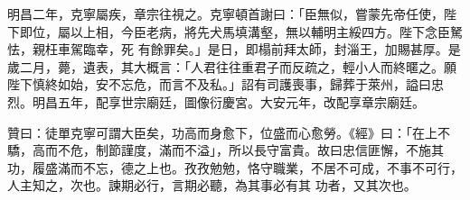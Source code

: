 \begin{pinyinscope}
 明昌二年，克寧屬疾，章宗往視之。克寧頓首謝曰：「臣無似，嘗蒙先帝任使，陛下即位，屬以上相，今臣老病，將先犬馬填溝壑，無以輔明主綏四方。陛下念臣駑怯，親枉車駕臨幸，死
 有餘罪矣。」是日，即榻前拜太師，封淄王，加賜甚厚。是歲二月，薨，遺表，其大概言：「人君往往重君子而反疏之，輕小人而終暱之。願陛下慎終如始，安不忘危，而言不及私。」詔有司護喪事，歸葬于萊州，謚曰忠烈。明昌五年，配享世宗廟廷，圖像衍慶宮。大安元年，改配享章宗廟廷。



 贊曰：徒單克寧可謂大臣矣，功高而身愈下，位盛而心愈勞。《經》曰：「在上不驕，高而不危，制節謹度，滿而不溢」，所以長守富貴。故曰忠信匪懈，不施其功，履盛滿而不忘，德之上也。孜孜勉勉，恪守職業，不居不可成，不事不可行，人主知之，次也。諫期必行，言期必聽，為其事必有其
 功者，又其次也。



\end{pinyinscope}